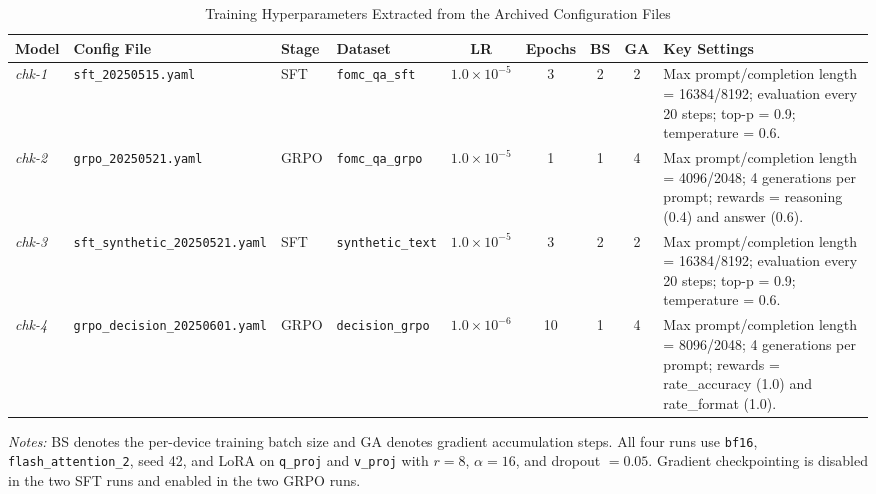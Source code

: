 \begin{table}[h]
    \centering
    \footnotesize
    \begin{tabularx}{\textwidth}{p{} p{} p{} p{} c c c c X}
        \toprule
        \textbf{Model} & \textbf{Config File} & \textbf{Stage} & \textbf{Dataset} & \textbf{LR} & \textbf{Epochs} & \textbf{BS} & \textbf{GA} & \textbf{Key Settings} \\
        \midrule
        \textit{chk-1} & \texttt{sft\_20250515.yaml} & SFT & \texttt{fomc\_qa\_sft} & $1.0\times10^{-5}$ & 3 & 2 & 2 & Max prompt/completion length = 16384/8192; evaluation every 20 steps; top-p = 0.9; temperature = 0.6. \\
        \textit{chk-2} & \texttt{grpo\_20250521.yaml} & GRPO & \texttt{fomc\_qa\_grpo} & $1.0\times10^{-5}$ & 1 & 1 & 4 & Max prompt/completion length = 4096/2048; 4 generations per prompt; rewards = reasoning (0.4) and answer (0.6). \\
        \textit{chk-3} & \texttt{sft\_synthetic\_20250521.yaml} & SFT & \texttt{synthetic\_text} & $1.0\times10^{-5}$ & 3 & 2 & 2 & Max prompt/completion length = 16384/8192; evaluation every 20 steps; top-p = 0.9; temperature = 0.6. \\
        \textit{chk-4} & \texttt{grpo\_decision\_20250601.yaml} & GRPO & \texttt{decision\_grpo} & $1.0\times10^{-6}$ & 10 & 1 & 4 & Max prompt/completion length = 8096/2048; 4 generations per prompt; rewards = rate\_accuracy (1.0) and rate\_format (1.0). \\
        \bottomrule
    \end{tabularx}
    \caption{Training Hyperparameters Extracted from the Archived Configuration Files}
    \label{tab:ch2:training_hyperparameters_archive}
\end{table}

\noindent\textit{Notes:} BS denotes the per-device training batch size and GA denotes gradient accumulation steps. All four runs use \texttt{bf16}, \texttt{flash\_attention\_2}, seed 42, and LoRA on \texttt{q\_proj} and \texttt{v\_proj} with $r=8$, $\alpha=16$, and dropout $=0.05$. Gradient checkpointing is disabled in the two SFT runs and enabled in the two GRPO runs.
